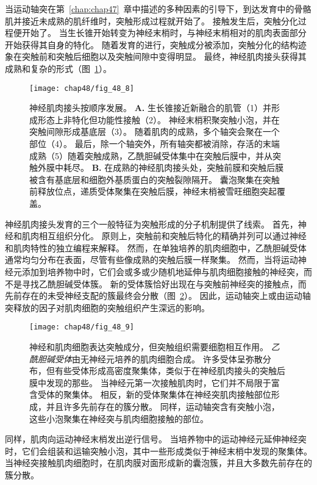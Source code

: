 当运动轴突在第~\ref{chap:chap47}~章中描述的多种因素的引导下，到达发育中的骨骼肌并接近未成熟的肌纤维时，突触形成过程就开始了。
接触发生后，突触分化过程便开始了。
当生长锥开始转变为神经末梢时，与神经末梢相对的肌肉表面部分开始获得其自身的特化。
随着发育的进行，突触成分被添加，突触分化的结构迹象在突触前和突触后细胞以及突触间隙中变得明显。
最终，神经肌肉接头获得其成熟和复杂的形式（图~\ref{fig:48_8}）。


\begin{figure}[htbp]
	\centering
	\texttt{[image: chap48/fig\_48\_8]}
	\caption{神经肌肉接头按顺序发展。
		\textbf{A.} 生长锥接近新融合的肌管（1）并形成形态上非特化但功能性接触（2）。
		神经末梢积聚突触小泡，并在突触间隙形成基底层（3）。
		随着肌肉的成熟，多个轴突会聚在一个部位（4）。
		最后，除一个轴突外，所有轴突都被消除，存活的末端成熟（5）随着突触成熟，乙酰胆碱受体集中在突触后膜中，并从突触外膜中耗尽\cite{hall1993synaptic}。
		\textbf{B.} 在成熟的神经肌肉接头处，突触前膜和突触后膜被含有基底层和细胞外基质蛋白的突触裂隙隔开。
		囊泡聚集在突触前释放位点，递质受体聚集在突触后膜，神经末梢被雪旺细胞突起覆盖。}
	\label{fig:48_8}
\end{figure}


神经肌肉接头发育的三个一般特征为突触形成的分子机制提供了线索。 
首先，神经和肌肉相互组织分化。
原则上，突触前和突触后特化的精确并列可以通过神经和肌肉特性的独立编程来解释。
然而，在单独培养的肌肉细胞中，乙酰胆碱受体通常均匀分布在表面，尽管有些像成熟的突触后膜一样聚集。
然而，当将运动神经元添加到培养物中时，它们会或多或少随机地延伸与肌肉细胞接触的神经突，而不是寻找乙酰胆碱受体簇。
新的受体簇恰好出现在与突触前神经突的接触点，而先前存在的未受神经支配的簇最终会分散（图~\ref{fig:48_9}）。
因此，运动轴突上或由运动轴突释放的因子对肌肉细胞的突触组织产生深远的影响。


\begin{figure}[htbp]
	\centering
	\texttt{[image: chap48/fig\_48\_9]}
	\caption{神经和肌肉细胞表达突触成分，但突触组织需要细胞相互作用。
		\textit{乙酰胆碱受体}由无神经元培养的肌肉细胞合成。
		许多受体呈弥散分布，但有些受体形成高密度聚集体，类似于在神经肌肉接头的突触后膜中发现的那些。
		当神经元第一次接触肌肉时，它们并不局限于富含受体的聚集体。
		相反，新的受体聚集体在神经突肌肉接触部位形成，并且许多先前存在的簇分散。
		同样，运动轴突含有突触小泡，这些小泡聚集在神经突与肌肉细胞接触的部位\cite{anderson1977nerve,lupa1990specific}。}
	\label{fig:48_9}
\end{figure}


同样，肌肉向运动神经末梢发出逆行信号。
当培养物中的运动神经元延伸神经突时，它们会组装和运输突触小泡，其中一些形成类似于神经末梢中发现的聚集体。
当神经突接触肌肉细胞时，在肌肉膜对面形成新的囊泡簇，并且大多数先前存在的簇分散。



